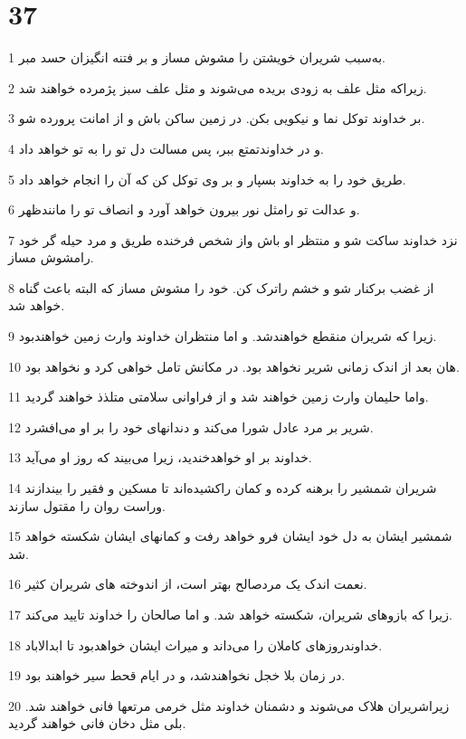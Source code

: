 \chapter{37}

\par 1 به‌سبب شریران خویشتن را مشوش مساز و بر فتنه انگیزان حسد مبر.
\par 2 زیراکه مثل علف به زودی بریده می‌شوند و مثل علف سبز پژمرده خواهند شد.
\par 3 بر خداوند توکل نما و نیکویی بکن. در زمین ساکن باش و از امانت پرورده شو.
\par 4 و در خداوندتمتع ببر، پس مسالت دل تو را به تو خواهد داد.
\par 5 طریق خود را به خداوند بسپار و بر وی توکل کن که آن را انجام خواهد داد.
\par 6 و عدالت تو رامثل نور بیرون خواهد آورد و انصاف تو را مانندظهر.
\par 7 نزد خداوند ساکت شو و منتظر او باش واز شخص فرخنده طریق و مرد حیله گر خود رامشوش مساز.
\par 8 از غضب برکنار شو و خشم راترک کن. خود را مشوش مساز که البته باعث گناه خواهد شد.
\par 9 زیرا که شریران منقطع خواهندشد. و اما منتظران خداوند وارث زمین خواهندبود.
\par 10 هان بعد از اندک زمانی شریر نخواهد بود. در مکانش تامل خواهی کرد و نخواهد بود.
\par 11 واما حلیمان وارث زمین خواهند شد و از فراوانی سلامتی متلذذ خواهند گردید.
\par 12 شریر بر مرد عادل شورا می‌کند و دندانهای خود را بر او می‌افشرد.
\par 13 خداوند بر او خواهدخندید، زیرا می‌بیند که روز او می‌آید.
\par 14 شریران شمشیر را برهنه کرده و کمان راکشیده‌اند تا مسکین و فقیر را بیندازند وراست روان را مقتول سازند.
\par 15 شمشیر ایشان به دل خود ایشان فرو خواهد رفت و کمانهای ایشان شکسته خواهد شد.
\par 16 نعمت اندک یک مردصالح بهتر است، از اندوخته های شریران کثیر.
\par 17 زیرا که بازوهای شریران، شکسته خواهد شد. و اما صالحان را خداوند تایید می‌کند.
\par 18 خداوندروزهای کاملان را می‌داند و میراث ایشان خواهدبود تا ابدالاباد.
\par 19 در زمان بلا خجل نخواهندشد، و در ایام قحط سیر خواهند بود.
\par 20 زیراشریران هلاک می‌شوند و دشمنان خداوند مثل خرمی مرتعها فانی خواهند شد. بلی مثل دخان فانی خواهند گردید.
